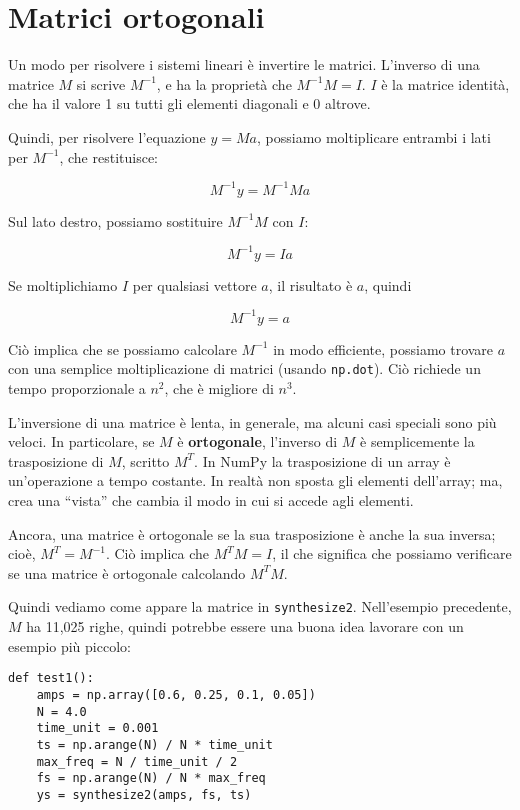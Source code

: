 \documentclass[12pt,a4paper]{book}
\begin{document}
\section{Matrici ortogonali} 

Un modo per risolvere i sistemi lineari è invertire le matrici. L'inverso di una matrice $M$ si scrive $M^{-1}$, e ha la proprietà che $M^{-1}M = I$. $I$ è la matrice identità, che ha il valore 1 su tutti gli elementi diagonali e 0 altrove.

Quindi, per risolvere l'equazione $y = Ma$, possiamo moltiplicare entrambi i lati per $M^{-1}$, che restituisce:

%
\[ M^{-1}y = M^{-1} M a \] 

%
Sul lato destro, possiamo sostituire $M^{-1}M$ con $I$:

%
\[ M^{-1}y = I a \] 

%
Se moltiplichiamo $I$ per qualsiasi vettore $a$, il risultato è $a$, quindi

%
\[ M^{-1}y = a \] 

%
Ciò implica che se possiamo calcolare $M^{-1}$ in modo efficiente, possiamo trovare $a$ con una semplice moltiplicazione di matrici (usando {\tt np.dot}). Ciò richiede un tempo proporzionale a $n^2$, che è migliore di $n^3$.

L'inversione di una matrice è lenta, in generale, ma alcuni casi speciali sono più veloci. In particolare, se $M$ è {\bf ortogonale}, l'inverso di $M$ è semplicemente la trasposizione di $M$, scritto $M^T$. In NumPy la trasposizione di un array è un'operazione a tempo costante. In realtà non sposta gli elementi dell'array; ma, crea una ``vista'' che cambia il modo in cui si accede agli elementi.

Ancora, una matrice è ortogonale se la sua trasposizione è anche la sua inversa; cioè, $M^T = M^{-1}$. Ciò implica che $M^TM = I$, il che significa che possiamo verificare se una matrice è ortogonale calcolando $M^TM$.

Quindi vediamo come appare la matrice in {\tt synthesize2}. Nell'esempio precedente, $M$ ha 11,025 righe, quindi potrebbe essere una buona idea lavorare con un esempio più piccolo:

\begin{verbatim} 
def test1():
    amps = np.array([0.6, 0.25, 0.1, 0.05])
    N = 4.0
    time_unit = 0.001
    ts = np.arange(N) / N * time_unit
    max_freq = N / time_unit / 2
    fs = np.arange(N) / N * max_freq
    ys = synthesize2(amps, fs, ts)
 \end{verbatim} 
\end{document}
